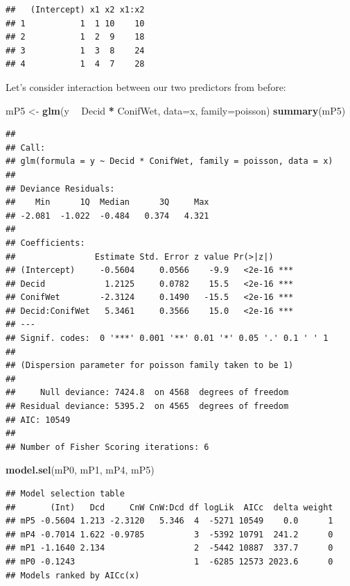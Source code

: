 \documentclass[12pt,]{book}
\newenvironment{Shaded}{\begin{snugshade}}{\end{snugshade}}
\newcommand{\DataTypeTok}[1]{\textcolor[rgb]{0.13,0.29,0.53}{#1}}
\newcommand{\KeywordTok}[1]{\textcolor[rgb]{0.13,0.29,0.53}{\textbf{#1}}}
\newcommand{\NormalTok}[1]{#1}
\newcommand{\OperatorTok}[1]{\textcolor[rgb]{0.81,0.36,0.00}{\textbf{#1}}}
\newcommand{\StringTok}[1]{\textcolor[rgb]{0.31,0.60,0.02}{#1}}
\begin{document}
\begin{verbatim}
##   (Intercept) x1 x2 x1:x2
## 1           1  1 10    10
## 2           1  2  9    18
## 3           1  3  8    24
## 4           1  4  7    28
\end{verbatim}

Let's consider interaction between our two predictors from before:

\begin{Shaded}
\begin{Highlighting}[]
\NormalTok{mP5 <-}\StringTok{ }\KeywordTok{glm}\NormalTok{(y }\OperatorTok{~}\StringTok{ }\NormalTok{Decid }\OperatorTok{*}\StringTok{ }\NormalTok{ConifWet, }\DataTypeTok{data=}\NormalTok{x, }\DataTypeTok{family=}\NormalTok{poisson)}
\KeywordTok{summary}\NormalTok{(mP5)}
\end{Highlighting}
\end{Shaded}

\begin{verbatim}
## 
## Call:
## glm(formula = y ~ Decid * ConifWet, family = poisson, data = x)
## 
## Deviance Residuals: 
##    Min      1Q  Median      3Q     Max  
## -2.081  -1.022  -0.484   0.374   4.321  
## 
## Coefficients:
##                Estimate Std. Error z value Pr(>|z|)    
## (Intercept)     -0.5604     0.0566    -9.9   <2e-16 ***
## Decid            1.2125     0.0782    15.5   <2e-16 ***
## ConifWet        -2.3124     0.1490   -15.5   <2e-16 ***
## Decid:ConifWet   5.3461     0.3566    15.0   <2e-16 ***
## ---
## Signif. codes:  0 '***' 0.001 '**' 0.01 '*' 0.05 '.' 0.1 ' ' 1
## 
## (Dispersion parameter for poisson family taken to be 1)
## 
##     Null deviance: 7424.8  on 4568  degrees of freedom
## Residual deviance: 5395.2  on 4565  degrees of freedom
## AIC: 10549
## 
## Number of Fisher Scoring iterations: 6
\end{verbatim}

\begin{Shaded}
\begin{Highlighting}[]
\KeywordTok{model.sel}\NormalTok{(mP0, mP1, mP4, mP5)}
\end{Highlighting}
\end{Shaded}

\begin{verbatim}
## Model selection table 
##       (Int)   Dcd     CnW CnW:Dcd df logLik  AICc  delta weight
## mP5 -0.5604 1.213 -2.3120   5.346  4  -5271 10549    0.0      1
## mP4 -0.7014 1.622 -0.9785          3  -5392 10791  241.2      0
## mP1 -1.1640 2.134                  2  -5442 10887  337.7      0
## mP0 -0.1243                        1  -6285 12573 2023.6      0
## Models ranked by AICc(x)
\end{verbatim}
\end{document}
